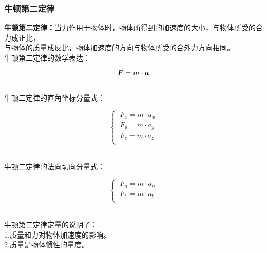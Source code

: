 \documentclass[UTF8]{ctexart}
\newcommand*{\veb}[1]{\vb*{#1}}
\begin{document}
\subsubsection{牛顿第二定律}
    \textbf{牛顿第二定律：}当力作用于物体时，物体所得到的加速度的大小，与物体所受的合力成正比，\\
    与物体的质量成反比，物体加速度的方向与物体所受的合外力方向相同。\\[3mm]
    牛顿第二定律的数学表达：
    \begin{large}
        \begin{equation*}
            \veb{F}=m\cdot\veb{a}
        \end{equation*}
    \end{large}\\
    牛顿二定律的直角坐标分量式：\vspace{5pt}
    \begin{large}
        \begin{equation*}
            \begin{cases}
                ~F_x=m\cdot a_x\\[1mm]
                ~F_y=m\cdot a_y\\[1mm]
                ~F_z=m\cdot a_z\\[1mm]
            \end{cases}
        \end{equation*}
    \end{large}\\
    牛顿二定律的法向切向分量式：\vspace{5pt}
    \begin{large}
        \begin{equation*}
            \begin{cases}
                ~F_n=m\cdot a_n\\[1mm]
                ~F_t\,=m\cdot a_t\\[1mm]
            \end{cases}
        \end{equation*}
    \end{large}\\
    牛顿第二定律定量的说明了：\\[3mm]
    1.质量和力对物体加速度的影响。\\[3mm]
    2.质量是物体惯性的量度。\\
\end{document}
